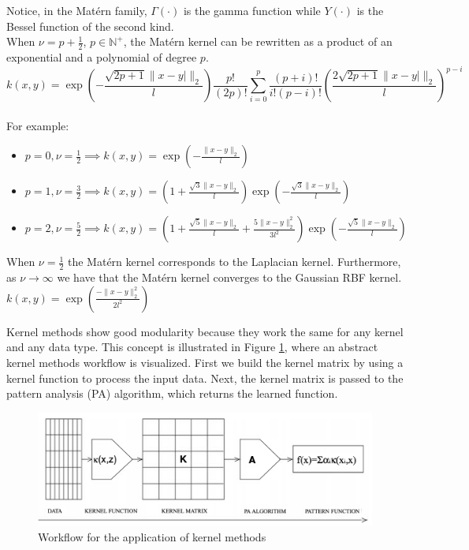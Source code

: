 Notice, in the Matérn family, $\Gamma(\cdot)$ is the gamma function while $Y(\cdot)$ is the Bessel function of the second kind.
\\
When $\nu=p+\frac{1}{2}$, $p \in \mathbb{N}^+$, the Matérn kernel can be rewritten as a product of an exponential and a polynomial of degree $p$. 
\\
$$k(x,y)=\exp \left(-{\frac {{\sqrt {2p+1}}\|x-y|\|_{2}}{l }}\right){\frac {p!}{(2p)!}}\sum\limits_{i=0}^{p}{\frac {(p+i)!}{i!(p-i)!}}\left({\frac {2{\sqrt {2p+1}}\|x-y|\|_{2}}{l }}\right)^{p-i}$$
\\
For example:
\begin{itemize}
    \item $p=0,\nu=\frac{1}{2} \implies k(x,y)=\exp\left(-\frac{\|x-y\|_{2}}{l}\right)$
    \item $p=1,\nu=\frac{3}{2} \implies 
    k(x,y)=\left(1+{\frac {{\sqrt {3}}\|x-y\|_{2}}{l }}\right)\exp \left(-{\frac {{\sqrt {3}}\|x-y\|_{2}}{l }}\right)$
    \item $p=2,\nu=\frac{5}{2} \implies k(x,y)=\left(1+{\frac {{\sqrt {5}}\|x-y\|_{2}}{l }}+{\frac {5\|x-y\|_{2}^{2}}{3 l ^{2}}}\right)\exp \left(-{\frac {{\sqrt {5}}\|x-y\|_{2}}{l }}\right)$
\end{itemize}

When $\nu=\frac{1}{2}$ the Matérn kernel corresponds to the Laplacian kernel.
Furthermore, as $\nu \to \infty$ we have that the Matérn kernel converges to the Gaussian RBF kernel.
$k(x,y)=\exp\left(\frac{-\|x-y\|_{2}^2}{2l^2}\right)$




Kernel methods show good modularity because they work the same for any kernel and any data type. This concept is illustrated in Figure \ref{fig:workflow_kernels}, where an abstract kernel methods workflow is visualized. First we build the kernel matrix by using a kernel function to process the input data. Next, the kernel matrix is passed to the pattern analysis (PA) algorithm, which returns the learned function.

\begin{figure}[!ht]
    \includegraphics[width=\textwidth]{images/workflow_kernels.png}
    \caption{Workflow for the application of kernel methods \cite{shawe2004kernel}}
    \label{fig:workflow_kernels}
\end{figure}